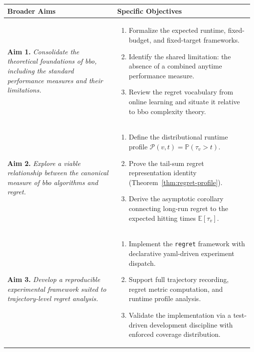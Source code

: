 \begin{longtable}{||p{}|p{}||}
  \hline
  \textbf{Broader Aims} & \textbf{Specific Objectives} \\
  \hline
  \hline
  \endhead
  \hline
  \textbf{Aim 1. } \emph{Consolidate the theoretical foundations of
    \acrshort{bbo}, including the standard performance measures and
  their limitations.}
  &
  \begin{enumerate}[topsep=0pt, partopsep=0pt, itemsep=0pt,
      parsep=0pt, leftmargin=*]
    \item Formalize the expected runtime, fixed-budget, and
      fixed-target frameworks.
    \item Identify the shared limitation: the absence of a combined
      anytime performance measure.
    \item Review the regret vocabulary from online learning and
      situate it relative to \acrshort{bbo} complexity theory.
  \end{enumerate}
  \\
  \hline
  \textbf{Aim 2. } \emph{Explore a viable relationship between the
  canonical measure of \acrshort{bbo} algorithms and regret.}
  &
  \begin{enumerate}[topsep=0pt, partopsep=0pt, itemsep=0pt,
      parsep=0pt, leftmargin=*]
    \item Define the distributional runtime profile
      $\mathcal{P}(v, t) = \mathbb{P}(\tau_v > t)$.
    \item Prove the tail-sum regret representation identity
      (Theorem~\ref{thm:regret-profile}).
    \item Derive the asymptotic corollary connecting long-run regret
      to the expected hitting times $\mathbb{E}[\tau_v]$.
  \end{enumerate}
  \\
  \hline
  \textbf{Aim 3. } \emph{Develop a reproducible experimental framework
  suited to trajectory-level regret analysis.}
  &
  \begin{enumerate}[topsep=0pt, partopsep=0pt, itemsep=0pt,
      parsep=0pt, leftmargin=*]
    \item Implement the \texttt{regret} framework with declarative
      \acrshort{yaml}-driven experiment dispatch.
    \item Support full trajectory recording, regret metric computation,
      and runtime profile analysis.
    \item Validate the implementation via a test-driven development
      discipline with enforced coverage distribution.

\end{enumerate}
\end{longtable}
